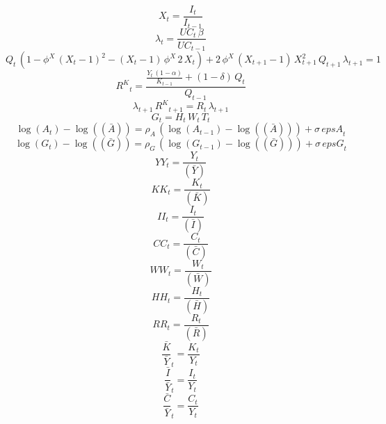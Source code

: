 \begin{dmath}
{X}_{t}=\frac{{I}_{t}}{{I}_{t-1}}
\end{dmath}
\begin{dmath}
{\lambda}_{t}=\frac{{UC}_{t}\, {{\beta}}}{{UC}_{t-1}}
\end{dmath}
\begin{dmath}
{Q}_{t}\, \left(1-{{\phi^X}}\, \left({X}_{t}-1\right)^{2}-\left({X}_{t}-1\right)\, {{\phi^X}}\, 2\, {X}_{t}\right)+2\, {{\phi^X}}\, \left({X}_{t+1}-1\right)\, {X}_{t+1}^{2}\, {Q}_{t+1}\, {\lambda}_{t+1}=1
\end{dmath}
\begin{dmath}
{R^{K}}_{t}=\frac{\frac{{Y}_{t}\, \left(1-{{\alpha}}\right)}{{K}_{t-1}}+\left(1-{{\delta}}\right)\, {Q}_{t}}{{Q}_{t-1}}
\end{dmath}
\begin{dmath}
{\lambda}_{t+1}\, {R^{K}}_{t+1}={R}_{t}\, {\lambda}_{t+1}
\end{dmath}
\begin{dmath}
{G}_{t}={H}_{t}\, {W}_{t}\, {T}_{t}
\end{dmath}
\begin{dmath}
\log\left({A}_{t}\right)-\log\left((\bar{A})\right)={{\rho_{A}}}\, \left(\log\left({A}_{t-1}\right)-\log\left((\bar{A})\right)\right)+{{\sigma}}\, {epsA}_{t}
\end{dmath}
\begin{dmath}
\log\left({G}_{t}\right)-\log\left((\bar{G})\right)={{\rho_{G}}}\, \left(\log\left({G}_{t-1}\right)-\log\left((\bar{G})\right)\right)+{{\sigma}}\, {epsG}_{t}
\end{dmath}
\begin{dmath}
{YY}_{t}=\frac{{Y}_{t}}{(\bar{Y})}
\end{dmath}
\begin{dmath}
{KK}_{t}=\frac{{K}_{t}}{(\bar{K})}
\end{dmath}
\begin{dmath}
{II}_{t}=\frac{{I}_{t}}{(\bar{I})}
\end{dmath}
\begin{dmath}
{CC}_{t}=\frac{{C}_{t}}{(\bar{C})}
\end{dmath}
\begin{dmath}
{WW}_{t}=\frac{{W}_{t}}{(\bar{W})}
\end{dmath}
\begin{dmath}
{HH}_{t}=\frac{{H}_{t}}{(\bar{H})}
\end{dmath}
\begin{dmath}
{RR}_{t}=\frac{{R}_{t}}{(\bar{R})}
\end{dmath}
\begin{dmath}
{\frac{\bar{K}}{\bar{Y}}}_{t}=\frac{{K}_{t}}{{Y}_{t}}
\end{dmath}
\begin{dmath}
{\frac{\bar{I}}{\bar{Y}}}_{t}=\frac{{I}_{t}}{{Y}_{t}}
\end{dmath}
\begin{dmath}
{\frac{\bar{C}}{\bar{Y}}}_{t}=\frac{{C}_{t}}{{Y}_{t}}
\end{dmath}

